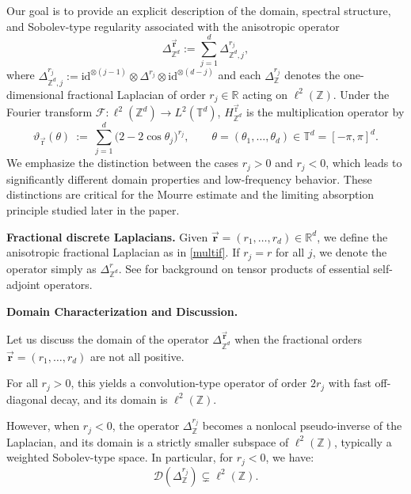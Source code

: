 \documentclass[10pt]{amsart} %
\newcommand{\T}{{\mathbb{T}}}
\newcommand{\Z}{{\mathbb{Z}}}
\newcommand{\1}{{\mathbb{I}}}
\numberwithin{equation}{section}
\begin{document}
Our goal is to provide an explicit description of the domain, spectral structure, and Sobolev-type regularity associated with the anisotropic operator
\begin{equation}\label{multif}
\Delta_{\mathbb{Z}^d}^{\vec{\mathbf{r}}} :=\sum_{j=1}^d \Delta_{\Z^d,j}^{r_j},
\end{equation}
where $\Delta_{\Z^d,j}^{r_j}:= \mathrm{id}^{\otimes (j-1)} \otimes \Delta^{r_j} \otimes \mathrm{id}^{\otimes (d-j)}$ and each \(\Delta_{\Z}^{r_j}\) denotes the one-dimensional fractional Laplacian of order \(r_j \in \mathbb{R}\) acting on \(\ell^2(\mathbb{Z})\).
Under the Fourier transform $\mathcal F:\ell^2(\Z^d)\to L^2(\T^d)$, $H_{\Z^d}^{\vec{\mathrm r}}$ is the multiplication operator by
\[
\vartheta_{\vec{\mathrm r}}(\theta)\ :=\ \sum_{j=1}^d \bigl(2-2\cos \theta_j\bigr)^{r_j},\qquad \theta=(\theta_1,\dots,\theta_d)\in\T^d=[-\pi,\pi]^d.
\]
We emphasize the distinction between the cases \(r_j > 0\) and \(r_j < 0\), which leads to significantly different domain properties and low-frequency behavior. These distinctions are critical for the Mourre estimate and the limiting absorption principle studied later in the paper.



\noindent\textbf{Fractional discrete Laplacians.} Given \(\vec{\mathbf{r}} = (r_1, \dots, r_d) \in \mathbb{R}^d\), we define the anisotropic fractional Laplacian as in \eqref{multif}. If \(r_j = r\) for all \(j\), we denote the operator simply as \(\Delta^r_{\mathbb{Z}^d}\). See \cite[Section VIII.10]{RS} for background on tensor products of essential self-adjoint operators.


\noindent\textbf{Domain Characterization and Discussion.}

Let us discuss the domain of the operator $\Delta_{\mathbb{Z}^d}^{\vec{\mathbf{r}}}$ when the fractional orders $\vec{\mathbf{r}} = (r_1, \dots,r_d)$ are not all positive.

For all $r_j > 0$, this yields a convolution-type operator of order $2r_j$ with fast off-diagonal decay, and its domain is $\ell^2(\mathbb{Z})$.

However, when $r_j < 0$, the operator $\Delta_{\mathbb{Z}}^{r_j}$ becomes a nonlocal pseudo-inverse of the Laplacian, and its domain is a strictly smaller subspace  of $\ell^2(\mathbb{Z})$, typically a weighted Sobolev-type space. In particular, for $r_j < 0$, we have:
\[
\mathcal{D}(\Delta_{\mathbb{Z}}^{r_j}) \subsetneq \ell^2(\mathbb{Z}).
\]
\end{document}
